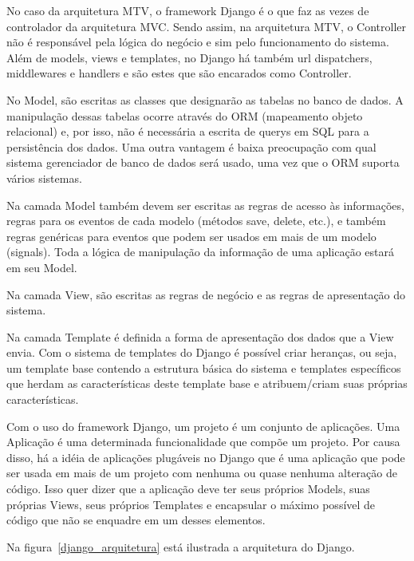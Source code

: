     No caso da arquitetura MTV, o framework Django é o que faz as vezes de controlador da arquitetura MVC. Sendo assim, na arquitetura MTV, o Controller não é responsável pela lógica do negócio e sim pelo funcionamento do sistema. Além de models, views e templates, no Django há também url dispatchers, middlewares e handlers e são estes que são encarados como Controller.

    No Model, são escritas as classes que designarão as tabelas no banco de dados. A manipulação dessas tabelas ocorre através do ORM (mapeamento objeto relacional) e, por isso, não é necessária a escrita de querys em SQL para a persistência dos dados. Uma outra vantagem é baixa preocupação com qual sistema gerenciador de banco de dados será usado, uma vez que o ORM suporta vários sistemas.

    Na camada Model também devem ser escritas as regras de acesso às informações, regras para os eventos de cada modelo (métodos save, delete, etc.), e também regras genéricas para eventos que podem ser usados em mais de um modelo (signals). Toda a lógica de manipulação da informação de uma aplicação estará em seu Model.

    Na camada View, são escritas as regras de negócio e as regras de apresentação do sistema.

    Na camada Template é definida a forma de apresentação dos dados que a View envia. Com o sistema de templates do Django é possível criar heranças, ou seja, um template base contendo a estrutura básica do sistema e templates específicos que herdam as características deste template base e atribuem/criam suas próprias características.

    Com o uso do framework Django, um projeto é um conjunto de aplicações. Uma Aplicação é uma determinada funcionalidade que compõe um projeto. Por causa disso, há a idéia de aplicações plugáveis no Django que é uma aplicação que pode ser usada em mais de um projeto com nenhuma ou quase nenhuma alteração de código. Isso quer dizer que a aplicação deve ter seus próprios Models, suas próprias Views, seus próprios Templates e encapsular o máximo possível de código que não se enquadre em um desses elementos.
    
    Na figura~\ref{django_arquitetura} está ilustrada a arquitetura do Django.

